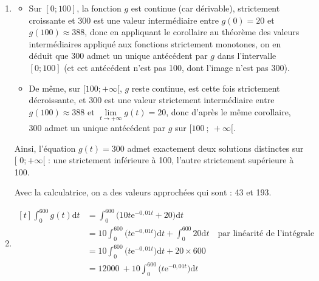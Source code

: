 \documentclass[10pt]{article}
\providecommand{\e}{{\mathrm{e}}}
\providecommand{\np}[2][]{{#2~#1}}
\renewcommand{\d}{{\mathrm{d}}}
\begin{document}
\begin{enumerate}
\begin{enumerate}
La fonction $g$ est donc strictement croissante sur l'intervalle $[0 ; 100]$, puis strictement décroissante sur $[100~;~+\infty[$.

On calcule $g(0) = 10\times 0 \times \e^{0}+20 = 20$ et $g(100) = 10 \times 100 \times \e^{-1} + 20 = 1000\e^{-1} + 20$ (avec $g(100)\approx 388$).

On peut donc établir le tableau de variations suivant :

\hfill~\hfill~
\end{enumerate}

	\item \begin{itemize}[label=$\bullet~$]
		\item Sur $[0 ; 100]$, la fonction $g$ est continue (car dérivable), strictement croissante et 300 est une valeur intermédiaire entre $g(0) = 20$ et $g(100)\approx 388$, donc en appliquant le corollaire au théorème des valeurs intermédiaires appliqué aux fonctions strictement monotones, on en déduit que 300 admet un unique antécédent par $g$ dans l'intervalle $[0;100]$ (et cet antécédent n'est pas 100, dont l'image n'est pas 300).
		\item De même, sur $[100;+\infty[$, $g$ reste continue, est cette fois strictement décroissante, et 300 est une valeur strictement intermédiaire entre $g(100)\approx 388$ et \linebreak $\lim\limits_{t\to +\infty}g(t) = 20$, donc d'après le même corollaire, $300$ admet un unique antécédent par $g$ sur $[100~;~+\infty[$.
	\end{itemize}

Ainsi, l'équation $g(t) = 300$ admet exactement deux solutions distinctes sur [ $0; + \infty[$ : une strictement inférieure à 100, l'autre strictement supérieure à 100.

Avec la calculatrice, on a des valeurs approchées qui sont : 43 et 193.

	\item $\begin{aligned}[t] \displaystyle \int_{0}^{600} g(t) \d t
	&= \int_{0}^{600} \big(10t\e^{-0,01t} + 20\big) \d t \\
	&= 10 \int_{0}^{600} \big(t\e^{-0,01t}\big) \d t  + \int_{0}^{600} 20 \d t \quad\text{par linéarité de l'intégrale}\\
	&= 10 \int_{0}^{600} \big(t\e^{-0,01t}\big) \d t  + 20\times 600\\
	&= \np{12000} + 10 \int_{0}^{600} \big(t\e^{-0,01t}\big) \d t\\
	\end{aligned}$


\end{enumerate}
\end{document}
